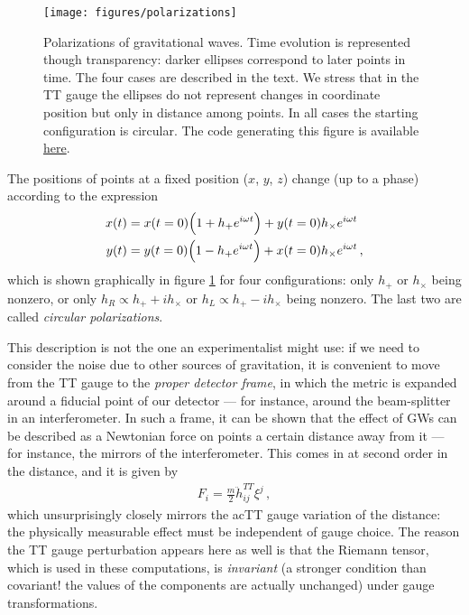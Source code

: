 \documentclass[main.tex]{subfiles}
\begin{document}
\begin{figure}[ht]
\centering
\texttt{[image: figures/polarizations]}
\caption{Polarizations of gravitational waves. Time evolution is represented though transparency: darker ellipses correspond to later points in time. The four cases are described in the text. We stress that in the \ac{TT} gauge the ellipses do not represent changes in coordinate position but only in distance among points. In all cases the starting configuration is circular. The code generating this figure is available \href{https://github.com/jacopok/master-thesis/blob/main/thesis/figures/polarizations.py}{here}.}
\label{fig:polarizations}
\end{figure}

The positions of points at a fixed position (\(x\), \(y\), \(z\)) change (up to a phase) according to the expression 
%
\begin{align}
x (t) &= x(t=0) \qty(1 + h_+ e^{i \omega t}) + y(t=0) h_\times  e^{i \omega t} \\
y (t) &= y(t=0) \qty(1 - h_+ e^{i \omega t}) + x(t=0) h_\times  e^{i \omega t} 
\,,
\end{align}
%
which is shown graphically in figure \ref{fig:polarizations} for four configurations: only \(h_+\) or \(h_\times \) being nonzero, or only \(h_R \propto h_+ + i h_\times \) or \(h_L \propto h_+ - i h_\times \) being nonzero. 
The last two are called \emph{circular polarizations}.

This description is not the one an experimentalist might use: if we need to consider the noise due to other sources of gravitation, it is convenient to move from the \ac{TT} gauge to the \emph{proper detector frame}, in which the metric is expanded around a fiducial point of our detector --- for instance, around the beam-splitter in an interferometer.
In such a frame, it can be shown that the effect of \acsp{GW} can be described as a Newtonian force on points a certain distance away from it --- for instance, the mirrors of the interferometer. This comes in at second order in the distance, and it is given by \cite[eq.\ 1.96]{maggioreGravitationalWavesVolume2007}
%
\begin{align}
F_{i} = \frac{m}{2} \ddot{h}_{ij}^{TT} \xi^{j}
\,,
\end{align}
%
which unsurprisingly closely mirrors the ac{TT} gauge variation of the distance: the physically measurable effect must be independent of gauge choice. 
The reason the \ac{TT} gauge perturbation appears here as well is that the Riemann tensor, which is used in these computations, is \emph{invariant} (a stronger condition than covariant! the values of the components are actually unchanged) under gauge transformations. 
\end{document}
